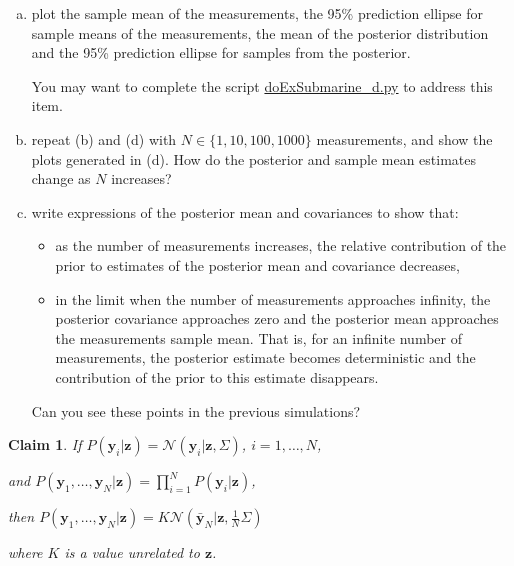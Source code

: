 \documentclass[12pt]{article}
\newtheorem{claim}{Claim}
\begin{document}
\begin{enumerate}[(a)]
    \item plot the sample mean of the measurements, the 95\% prediction ellipse for
        sample means of the measurements, the mean of the posterior distribution and the 95\%
        prediction ellipse for samples from the posterior.

        You may want to complete the script
        \href{https://github.com/joacorapela/gcnuBridging2023/blob/master/code/scripts/probability/unsupervisedInferenceInTheLinearGaussianModel/doExSubmarine_d.py}{doExSubmarine\_d.py}
        to address this item.

    \item repeat (b) and (d) with $N\in\{1,10,100,1000\}$ measurements, and show
        the plots generated in (d).  How do the posterior and sample mean
        estimates change as $N$ increases?

    \item write expressions of the posterior mean and covariances to show that:

        \begin{itemize}

            \item as the number of measurements increases, the relative
                contribution of the prior to estimates of the posterior
                mean and covariance decreases,

            \item in the limit when the number of measurements approaches
                infinity, the posterior covariance approaches zero and the
                posterior mean approaches the measurements sample mean.
                That is, for an infinite number of measurements, the
                posterior estimate becomes deterministic and the
                contribution of the prior to this estimate disappears.

        \end{itemize}

        Can you see these points in the previous simulations?

\end{enumerate}

\pagebreak

\begin{claim}
    If
    $P(\mathbf{y}_i|\mathbf{z})=\mathcal{N}\left(\mathbf{y}_i|\mathbf{z},\Sigma\right)$,
    $i=1,\ldots,N$, 

    and
    $P(\mathbf{y}_1,\ldots,\mathbf{y}_N|\mathbf{z})=\prod_{i=1}^N
    P(\mathbf{y}_i|\mathbf{z})$, 

    then
    $P(\mathbf{y}_1,\ldots,\mathbf{y}_N|\mathbf{z})=K\mathcal{N}(\bar{\mathbf{y}}_N|\mathbf{z},\frac{1}{N}\Sigma)$

    where $K$ is a value unrelated to $\mathbf{z}$.
    \label{claim:likelihoodForZ}
\end{claim}
\end{document}
